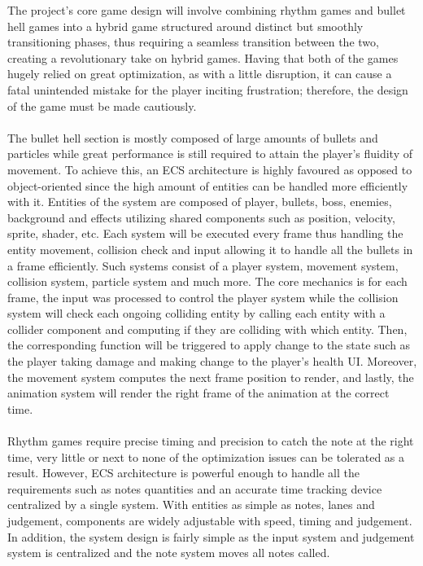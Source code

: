 The project’s core game design will involve combining rhythm games and bullet hell games into a hybrid game
structured around distinct but smoothly transitioning phases,
thus requiring a seamless transition between the two, creating a revolutionary take on hybrid games.
Having that both of the games hugely relied on great optimization, as with a little disruption,
it can cause a fatal unintended mistake for the player inciting frustration;
therefore, the design of the game must be made cautiously.
\\\\
The bullet hell section is mostly composed of large amounts of bullets and particles
while great performance is still required to attain the player’s fluidity of movement.
To achieve this, an ECS architecture is highly favoured as opposed to object-oriented
since the high amount of entities can be handled more efficiently with it.
Entities of the system are composed of player, bullets, boss, enemies, background and effects
utilizing shared components such as position, velocity, sprite, shader, etc.
Each system will be executed every frame thus handling the entity movement,
collision check and input allowing it to handle all the bullets in a frame efficiently.
Such systems consist of a player system, movement system, collision system, particle system and much more.
The core mechanics is for each frame, the input was processed to control the player system
while the collision system will check each ongoing colliding entity by calling each entity with a collider component
and computing if they are colliding with which entity.
Then, the corresponding function will be triggered to apply change to the state such as the player taking damage and making change to the player’s health UI\@.
Moreover, the movement system computes the next frame position to render, and lastly, the animation system will render the right frame of the animation at the correct time.
\\\\
Rhythm games require precise timing and precision to catch the note at the right time,
very little or next to none of the optimization issues can be tolerated as a result.
However, ECS architecture is powerful enough to handle all the requirements
such as notes quantities and an accurate time tracking device centralized by a single system.
With entities as simple as notes, lanes and judgement, components are widely adjustable with speed, timing and judgement.
In addition, the system design is fairly simple as the input system and judgement system is centralized and the note system moves all notes called.

